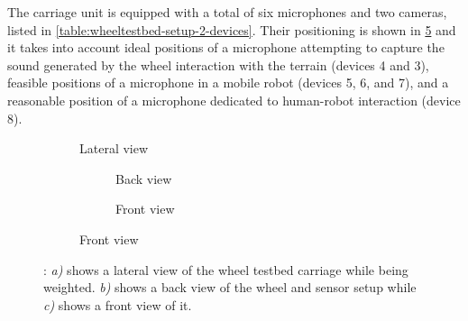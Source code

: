 The carriage unit is equipped with a total of six microphones and two cameras,
listed in \cref{table:wheeltestbed-setup-2-devices}. Their positioning is shown
in \cref{fig:wheeltestbed-setup-2} and it  takes into account ideal positions
of a microphone attempting to capture the sound generated by the wheel
interaction with the terrain (devices 4 and 3), feasible positions of a
microphone in a mobile robot (devices 5, 6, and 7), and a reasonable position
of a microphone dedicated to human-robot interaction (device 8).

\begin{figure}
    \begin{subfigure}{.57\linewidth}
        \centering
        
        \caption{Lateral view}
        \label{fig:wheeltestbed-setup-2-lateral}
    \end{subfigure}
    \hfill
    \begin{subfigure}{.40\linewidth}
        \begin{subfigure}{\linewidth}
            \centering
            
            \caption{Back view}
            \label{fig:wheeltestbed-setup-2-back}
        \end{subfigure}
        \bigskip
        
        \begin{subfigure}{\linewidth}
            \centering
            
            \caption{Front view}
            \label{fig:wheeltestbed-setup-2-front}
        \end{subfigure}
    \end{subfigure}
    \caption{
        : \emph{a)} shows a
        lateral view of the wheel testbed carriage while being weighted.
        \emph{b)} shows a back view of the wheel and sensor setup while
        \emph{c)} shows a front view of it.}
    \label{fig:wheeltestbed-setup-2}
\end{figure}

